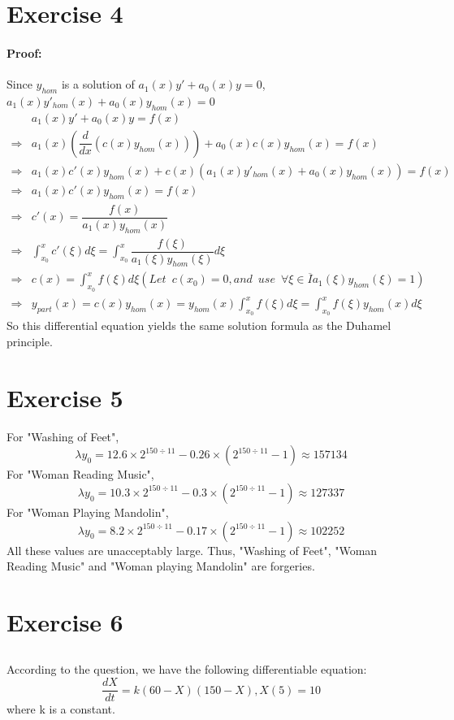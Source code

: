 \documentclass[a4paper,12pt,titlepage]{article}
\begin{document}
\section{Exercise 4}
\paragraph{Proof:}Since $y_{hom}$ is a solution of $a_1(x)y'+a_0(x)y=0$,  $a_1(x)y'_{hom}(x)+a_0(x)y_{hom}(x)=0$
\begin{align*}
&a_1(x)y'+a_0(x)y=f(x)\\
\Rightarrow&a_1(x)(\dfrac{d}{dx}(c(x)y_{hom}(x)))+a_0(x)c(x)y_{hom}(x)=f(x)\\
\Rightarrow&a_1(x)c'(x)y_{hom}(x)+c(x)(a_1(x)y'_{hom}(x)+a_0(x)y_{hom}(x))=f(x)\\
\Rightarrow&a_1(x)c'(x)y_{hom}(x)=f(x)\\
\Rightarrow&c'(x)=\dfrac{f(x)}{a_1(x)y_{hom}(x)}\\
\Rightarrow&\int_{x_0}^xc'(\xi)d\xi=\int_{x_0}^x\dfrac{f(\xi)}{a_1(\xi)y_{hom}(\xi)}d\xi\\
\Rightarrow&c(x)=\int_{x_0}^xf(\xi)d\xi(Let\,\,\,c(x_0)=0, and\,\,\,use\,\,\,\forall \xi\in \overline{I} a_1(\xi)y_{hom}(\xi)=1) \\
\Rightarrow&y_{part}(x)=c(x)y_{hom}(x)=y_{hom}(x)\int_{x_0}^xf(\xi)d\xi=\int_{x_0}^xf(\xi)y_{hom}(x)d\xi
\end{align*}
So this differential equation yields the same solution formula as the Duhamel principle.

\section{Exercise 5}
For "Washing of Feet",
$$\lambda y_0=12.6\times 2^{150\div 11}-0.26\times(2^{150\div 11}-1)\approx157134$$
For "Woman Reading Music",
$$\lambda y_0=10.3\times 2^{150\div 11}-0.3\times(2^{150\div 11}-1)\approx127337$$
For "Woman Playing Mandolin",
$$\lambda y_0=8.2\times 2^{150\div 11}-0.17\times(2^{150\div 11}-1)\approx102252$$
All these values are unacceptably large. Thus, "Washing of Feet", "Woman Reading Music" and "Woman playing Mandolin" are forgeries.
\section{Exercise 6}
\subsection{}
According to the question, we have the following differentiable equation:
$$\dfrac{dX}{dt}=k(60-X)(150-X),X(5)=10$$
where k is a constant.
\end{document}
